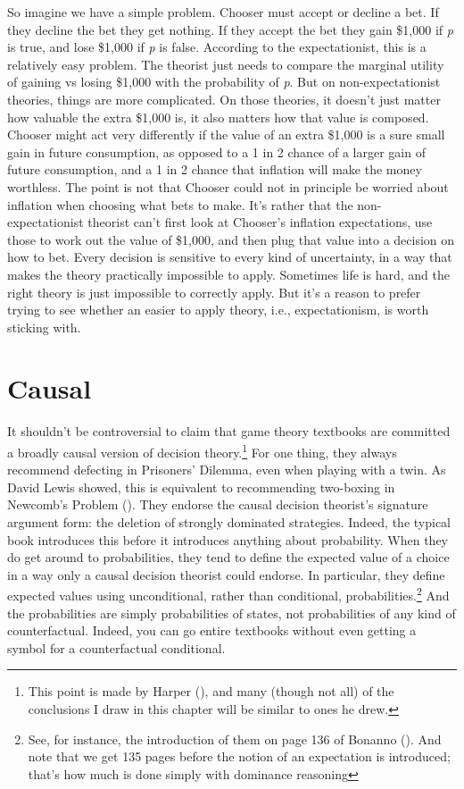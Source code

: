 \documentclass[
  12pt,
  letterpaper,
  DIV=11,
  numbers=noendperiod]{scrreprt}
\begin{document}
So imagine we have a simple problem. Chooser must accept or decline a
bet. If they decline the bet they get nothing. If they accept the bet
they gain \$1,000 if \emph{p} is true, and lose \$1,000 if \emph{p} is
false. According to the expectationist, this is a relatively easy
problem. The theorist just needs to compare the marginal utility of
gaining vs losing \$1,000 with the probability of \emph{p}. But on
non-expectationist theories, things are more complicated. On those
theories, it doesn't just matter how valuable the extra \$1,000 is, it
also matters how that value is composed. Chooser might act very
differently if the value of an extra \$1,000 is a sure small gain in
future consumption, as opposed to a 1 in 2 chance of a larger gain of
future consumption, and a 1 in 2 chance that inflation will make the
money worthless. The point is not that Chooser could not in principle be
worried about inflation when choosing what bets to make. It's rather
that the non-expectationist theorist can't first look at Chooser's
inflation expectations, use those to work out the value of \$1,000, and
then plug that value into a decision on how to bet. Every decision is
sensitive to every kind of uncertainty, in a way that makes the theory
practically impossible to apply. Sometimes life is hard, and the right
theory is just impossible to correctly apply. But it's a reason to
prefer trying to see whether an easier to apply theory, i.e.,
expectationism, is worth sticking with.


\chapter{Causal}\label{sec-causal}

It shouldn't be controversial to claim that game theory textbooks are
committed a broadly causal version of decision theory.\footnote{This
  point is made by Harper (), and many
  (though not all) of the conclusions I draw in this chapter will be
  similar to ones he drew.} For one thing, they always recommend
defecting in Prisoners' Dilemma, even when playing with a twin. As David
Lewis showed, this is equivalent to recommending two-boxing in Newcomb's
Problem (). They endorse the
causal decision theorist's signature argument form: the deletion of
strongly dominated strategies. Indeed, the typical book introduces this
before it introduces anything about probability. When they do get around
to probabilities, they tend to define the expected value of a choice in
a way only a causal decision theorist could endorse. In particular, they
define expected values using unconditional, rather than conditional,
probabilities.\footnote{See, for instance, the introduction of them on
  page 136 of Bonanno (). And note that
  we get 135 pages before the notion of an expectation is introduced;
  that's how much is done simply with dominance reasoning} And the
probabilities are simply probabilities of states, not probabilities of
any kind of counterfactual. Indeed, you can go entire textbooks without
even getting a symbol for a counterfactual conditional.
\end{document}
